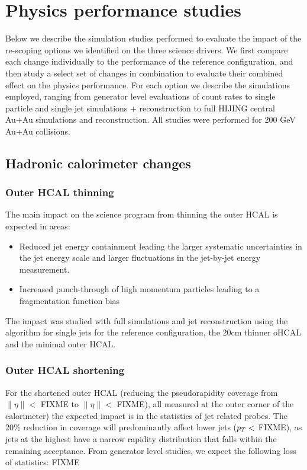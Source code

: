 

\chapter{Physics performance studies}
\label{cha:performance}

Below we describe the simulation studies performed to evaluate the impact of the re-scoping options we identified on the three 
science drivers. We  first compare each change individually to the performance of the reference configuration, and then study
a select set of changes in combination to evaluate their combined effect on the physics performance. For each option we 
describe the simulations employed, ranging from generator level evaluations of count rates to single particle and single jet
\geant simulations + reconstruction to full HIJING central Au+Au \geant simulations and reconstruction. All studies were 
performed for 200 GeV Au+Au collisions.
\section{Hadronic calorimeter changes}
\subsection{Outer HCAL thinning}
The main impact on the science program from thinning the outer HCAL is expected in areas:
\begin{itemize} 
\item Reduced jet energy containment leading the larger systematic uncertainties in the jet energy scale and larger fluctuations
in the jet-by-jet energy measurement.
\item Increased punch-through of high momentum particles leading to a fragmentation function bias
\end{itemize}
The impact was studied with full \geant simulations and jet reconstruction using the \antikt algorithm for single jets 
for the reference configuration, the 20cm thinner oHCAL and the minimal outer HCAL. 
\subsection{Outer HCAL shortening}

For the shortened outer HCAL (reducing the pseudorapidity coverage from $\| \eta \| <$ FIXME to $\| \eta \| < $ FIXME), all measured
at the outer corner of the calorimeter) the expected impact 
is in the statistics of jet related probes. The 20\% reduction in coverage will predominantly affect lower \pt jets ($\mbox{${p_T}$} <$ FIXME),
as jets at the highest \pT have a narrow rapidity distribution that falls within the remaining acceptance. From generator level 
studies, we expect the following loss of statistics: FIXME


